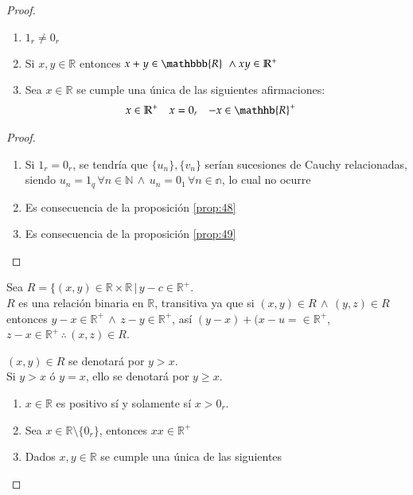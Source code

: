 \begin{proof}
\begin{proposition}\label{prop:51}
  \begin{enumerate} 
    \item $1_{r} \neq 0_{r}$
    \item Si $x, y \in \mathbb{R}$ entonces $x+y \in \mathbbb{R} \, \, \land xy
      \in \mathbb{R}^+$ 
    \item Sea $x \in \mathbb{R}$ se cumple una única de las siguientes
      afirmaciones: 
      \begin{align*}
        x &\in \mathbb{R}^+ & x &=0_r & -x &\in \mathhb{R}^+ 
      \end{align*}
  \end{enumerate}
\end{proposition}
\begin{proof}
  \begin{enumerate}
    \item Si $1_r = 0_r$, se tendría que $\{u_n\}, \{v_n\}$ serían sucesiones de Cauchy
      relacionadas, siendo $u_n = 1_q \, \forall n \in \mathbb{N} \, \land \, u_n =
      0_1 \, \forall n \in \mathbb{n}$, lo cual no ocurre  
    \item Es consecuencia de la proposición \ref{prop:48}
    \item Es consecuencia de la proposición \ref{prop:49}
  \end{enumerate}
\end{proof}
Sea $ R = \{ (x,y) \in \mathbb{R} \times \mathbb{R} \, | \, y-c \in
  \mathbb{R}^+$. \\
  $R$ es una relación binaria en $\mathbb{R}$, transitiva ya que si $(x,y) \in
  R \, \land \, (y,z) \in R$ entonces $y-x \in \mathbb{R}^+ \, \land \, z-y \in
  \mathbb{R}^+$, así $(y-x) + (x-u= \in  \mathbb{R}^+$, $z-x \in \mathbb{R}^+
  \, \therefore \, (x,z) \in R$.
  \begin{notation} $(x,y)\in R$ se denotará por $y>x$. \\
    Si $y>x$ ó $y=x$, ello se denotará por $y\geq x$.
  \end{notation}
  \begin{proposition} \label{prop:52} 
    \begin{enumerate}
      \item $x \in \mathbb{R}$ es positivo sí y solamente sí $x> 0_r$.
      \item Sea $x \in \mathbb{R} \setminus \{0_r\} $, entonces $xx \in
        \mathbb{R}^+$ 
      \item Dados $x,y \in \mathbb{R}$ se cumple una única de las siguientes

\end{enumerate}
\end{proposition}
\end{proof}
